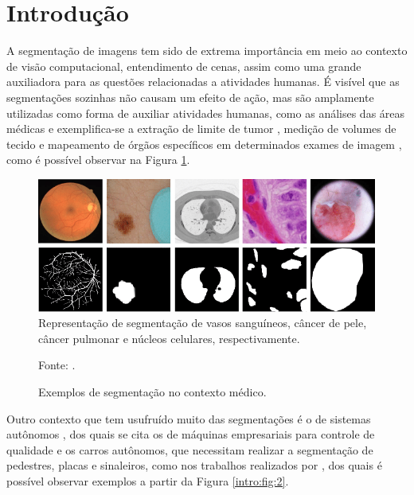\newpage
\clearpage
\section{Introdução}
\label{intro:intro}

A segmentação de imagens tem sido de extrema importância em meio ao contexto de visão computacional, entendimento de cenas, assim como uma grande auxiliadora para as questões relacionadas a atividades humanas. É visível que as segmentações sozinhas não causam um efeito de ação, mas são amplamente utilizadas como forma de auxiliar atividades humanas, como as análises das áreas médicas \cite{Lai2015, Withey2008} e exemplifica-se a extração de limite de tumor \cite{Malkanthi2017}, medição de volumes de tecido e mapeamento de órgãos específicos em determinados exames de imagem \cite{Gibson2018, Schoppe2020}, como é possível observar na Figura \ref{intro:fig:1}.

\begin{figure}[H]
    \centering
    \caption{Exemplos de segmentação no contexto médico.}
    \includegraphics[width=1\linewidth]{recursos/imagens/introduction/medical-image-segmentation.png}
    \label{intro:fig:1}
    {\tiny Representação de segmentação de vasos sanguíneos, câncer de pele, câncer pulmonar e núcleos celulares, respectivamente.}

    \vspace*{1 cm}
    Fonte: \cite{Asadi-Aghbolaghi2020}.
\end{figure}

Outro contexto que tem usufruído muito das segmentações é o de sistemas autônomos \cite{Kaymak2019, Liu2020, Pan2020, Teichmann2018}, dos quais se cita os de máquinas empresariais para controle de qualidade e os carros autônomos, que necessitam realizar a segmentação de pedestres, placas e sinaleiros, como nos trabalhos realizados por \cite{Lee2018, Fleyeh2004, Pan2020}, dos quais é possível observar exemplos a partir da Figura \ref{intro:fig:2}.

